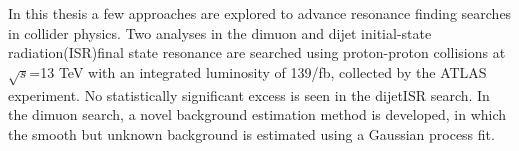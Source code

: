 %
%
%
%
%
%
In this thesis a few approaches are explored to advance resonance finding searches in collider physics. Two analyses in the dimuon and dijet initial-state radiation(ISR)final state resonance are searched using proton-proton collisions at $\sqrt{s}$=13 TeV with an integrated luminosity of 139/fb, collected by the ATLAS experiment. No statistically significant excess is seen in the dijetISR search. In the dimuon search, a novel background estimation method is developed, in which the smooth but
unknown background is estimated using a Gaussian process fit.
